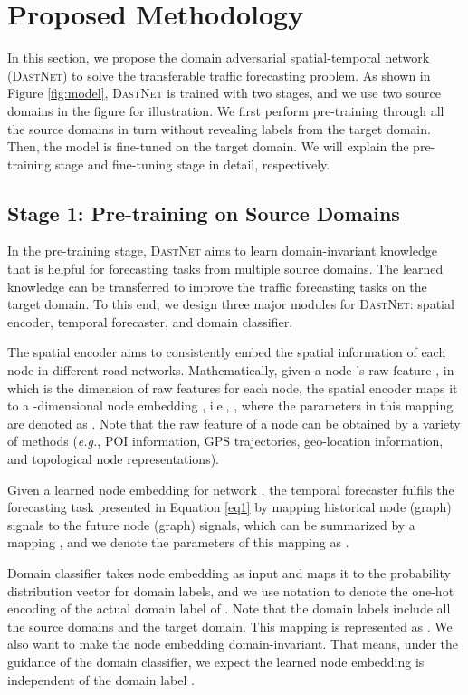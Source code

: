 \documentclass[sigconf]{acmart}
\theoremstyle{definition}
\begin{document}
\section{Proposed Methodology}\label{sec:method}
In this section, we propose the domain adversarial spatial-temporal network (\textsc{DastNet}) to solve the transferable traffic forecasting problem. As shown in Figure \ref{fig:model}, \textsc{DastNet} is trained with two stages, and we use two source domains in the figure for illustration. We first perform pre-training through all the source domains in turn without revealing labels from the target domain. Then, the model is fine-tuned on the target domain. We will explain the pre-training stage and fine-tuning stage in detail, respectively.



\subsection{Stage 1: Pre-training on Source Domains}
In the pre-training stage, \textsc{DastNet} aims to learn domain-invariant knowledge that is helpful for forecasting tasks from multiple source domains. The learned knowledge can be transferred to improve the traffic forecasting tasks on the target domain. To this end, we design three major modules for \textsc{DastNet}: spatial encoder, temporal forecaster, and domain classifier.



The spatial encoder aims to consistently embed the spatial information of each node in different road networks. Mathematically, given a node 's raw feature , in which  is the dimension of raw features for each node, the spatial encoder maps it to a -dimensional node embedding , i.e., , where the parameters in this mapping  are denoted as . Note that the raw feature of a node can be obtained by a variety of methods ({\em e.g.}, POI information, GPS trajectories, geo-location information, and topological node representations).

Given a learned node embedding  for network , the temporal forecaster fulfils the forecasting task  presented in Equation \ref{eq1} by mapping historical node (graph) signals to the future node (graph) signals, which can be summarized by a mapping , and we denote the parameters of this mapping  as . 

Domain classifier takes node embedding  as input and maps it to the probability distribution vector  for domain labels, and we use notation  to denote the one-hot encoding of the actual domain label of . Note that the domain labels include all the source domains and the target domain. This mapping is represented as . We also want to make the node embedding  domain-invariant. That means, under the guidance of the domain classifier, we expect the learned node embedding  is independent of the domain label .
\end{document}
